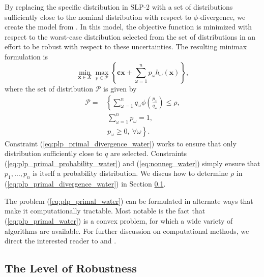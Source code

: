 \documentclass[11pt]{article}
\newcommand{\x}{\mathbf{x}}
\renewcommand{\c}{\mathbf{c}}
\theoremstyle{plain}
\theoremstyle{definition}
\theoremstyle{remark}
\begin{document}
By replacing the specific distribution in SLP-2 with a set of distributions sufficiently close to the nominal distribution with respect to $\phi$-divergence, we create the model from \citep{love2013phi}.
In this model, the objective function is minimized with respect to the worst-case distribution selected from the set of distributions in an effort to be robust with respect to these uncertainties.
The resulting minimax formulation is
\begin{equation}
	\min_{\x \in X} \max_{p \in \mathcal{P}} \left\{ \c\x + \sum_{\omega=1}^{n} p_\omega h_\omega(\x) \right\}, \label{eq:plp_primal_water}
\end{equation}
where the set of distribution $\mathcal{P}$ is given by
\begin{align}
	\mathcal{P} = & \left\{ \sum_{\omega = 1}^{n} q_\omega \phi\left(\frac{p_\omega}{q_\omega}\right) \leq \rho, \right. \label{eq:plp_primal_divergence_water} \\
	& \ \sum_{\omega=1}^{n} p_\omega = 1, \label{eq:plp_primal_probability_water} \\
	& \ \left. p_\omega \geq 0,\ \forall \omega \right\}. \label{eq:nonneg_water}
\end{align}
Constraint (\ref{eq:plp_primal_divergence_water}) works to ensure that only distribution sufficiently close to $q$ are selected.
Constraints (\ref{eq:plp_primal_probability_water}) and (\ref{eq:nonneg_water}) simply ensure that $p_1, \dots, p_n$ is itself a probability distribution.
We discus how to determine $\rho$ in (\ref{eq:plp_primal_divergence_water}) in Section \ref{ssec:robust_level_water}.

The problem (\ref{eq:plp_primal_water}) can be formulated in alternate ways that make it computationally tractable.
Most notable is the fact that (\ref{eq:plp_primal_water}) is a convex problem, for which a wide variety of algorithms are available.
For further discussion on computational methods, we direct the interested reader to \citep{bental2011robust} and \citep{love2013phi}.


\subsection{The Level of Robustness}
\label{ssec:robust_level_water}
\end{document}
